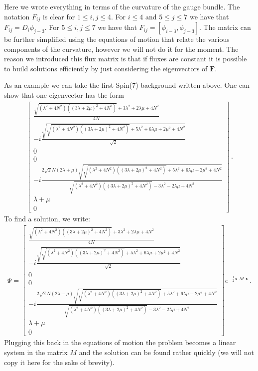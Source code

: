 \documentclass[12pt]{article}%
\numberwithin{equation}{section}
\newcommand{\al}[1]{\begin{align}#1\end{align}}
\renewcommand{\(}{\left(}
\renewcommand{\)}{\right)}
\renewcommand{\[}{\left[}
\renewcommand{\]}{\right]}
\begin{document}
%
Here we wrote everything in terms of the curvature of the gauge bundle. The notation $F_{ij}$ is clear for $1\leq i,j \leq 4$. For $i\leq 4$ and $5\leq j\leq 7$ we have that $F_{ij} = D_i \phi_{j-3}$. For $5\leq i,j\leq 7$ we have that $F_{ij} = [\phi_{i-3},\phi_{j-3}]$. The matrix can be further simplified using the equations of motion that relate the various components of the curvature, however we will not do it for the moment. The reason we introduced this flux matrix is that if fluxes are constant it is possible to build solutions efficiently by just considering the eigenvectors of $\mathbf F$.

As an example we can take the first Spin(7)  background written above. One can show that one eigenvector has the form
%
\al{\left[
\begin{array}{c}\frac{\sqrt{\left(\lambda ^2+4 N ^2\right) \left((3 \lambda +2 \mu )^2+4 N
   ^2\right)}+3 \lambda ^2+2 \lambda  \mu +4 N ^2}{4 N
   }\\-i\frac{\sqrt{\sqrt{\left(\lambda ^2+4 N ^2\right) \left((3 \lambda +2 \mu )^2+4
   N ^2\right)}+5 \lambda ^2+6 \lambda  \mu +2 \mu ^2+4 N
   ^2}}{\sqrt{2}}\\0\\0\\-i\frac{2 \sqrt{2} N  (2 \lambda +\mu )
   \sqrt{\sqrt{\left(\lambda ^2+4 N ^2\right) \left((3 \lambda +2 \mu )^2+4 N
   ^2\right)}+5 \lambda ^2+6 \lambda  \mu +2 \mu ^2+4 N ^2}}{\sqrt{\left(\lambda ^2+4
   N ^2\right) \left((3 \lambda +2 \mu )^2+4 N ^2\right)}-3 \lambda ^2-2 \lambda
   \mu +4 N ^2}\\ \lambda +\mu \\0\end{array}\right]\,.
}
%
To find a solution, we write:
%
\al{\Psi = \left[
\begin{array}{c}\frac{\sqrt{\left(\lambda ^2+4 N ^2\right) \left((3 \lambda +2 \mu )^2+4 N
   ^2\right)}+3 \lambda ^2+2 \lambda  \mu +4 N ^2}{4 N
   }\\-i\frac{\sqrt{\sqrt{\left(\lambda ^2+4 N ^2\right) \left((3 \lambda +2 \mu )^2+4
   N ^2\right)}+5 \lambda ^2+6 \lambda  \mu +2 \mu ^2+4 N
   ^2}}{\sqrt{2}}\\0\\0\\-i\frac{2 \sqrt{2} N  (2 \lambda +\mu )
   \sqrt{\sqrt{\left(\lambda ^2+4 N ^2\right) \left((3 \lambda +2 \mu )^2+4 N
   ^2\right)}+5 \lambda ^2+6 \lambda  \mu +2 \mu ^2+4 N ^2}}{\sqrt{\left(\lambda ^2+4
   N ^2\right) \left((3 \lambda +2 \mu )^2+4 N ^2\right)}-3 \lambda ^2-2 \lambda
   \mu +4 N ^2}\\ \lambda +\mu \\0\end{array}\right] e^{-\frac{1}{2} \mathbf x.  M.\mathbf x}\,.
}
%
Plugging this back in the equations of motion the problem becomes a linear system in the matrix $M$ and the solution can be found rather quickly (we will not copy it here for the sake of brevity).
\end{document}
